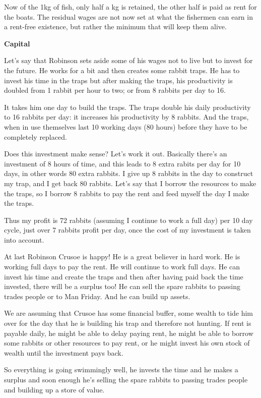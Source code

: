 \documentclass[]{tufte-handout}
\begin{document}
Now of the 1kg of fish, only half a kg is retained, the other half is
paid as rent for the boats. The residual wages are not now set at what
the fishermen can earn in a rent-free existence, but rather the minimum
that will keep them alive.

\textbf{Capital}

Let's say that Robinson sets aside some of his wages not to live but to
invest for the future. He works for a bit and then creates some rabbit
traps. He has to invest his time in the traps but after making the
traps, his productivity is doubled from 1 rabbit per hour to two; or
from 8 rabbits per day to 16.

It takes him one day to build the traps. The traps double his daily
productivity to 16 rabbits per day: it increases his productivity by 8
rabbits. And the traps, when in use themselves last 10 working days (80
hours) before they have to be completely replaced.

Does this investment make sense? Let's work it out. Basically there's an
investment of 8 hours of time, and this leads to 8 extra rabits per day
for 10 days, in other words 80 extra rabbits. I give up 8 rabbits in the
day to construct my trap, and I get back 80 rabbits. Let's say that I
borrow the resources to make the traps, so I borrow 8 rabbits to pay the
rent and feed myself the day I make the traps.

Thus my profit is 72 rabbits (assuming I continue to work a full day)
per 10 day cycle, just over 7 rabbits profit per day, once the cost of
my investment is taken into account.

At last Robinson Crusoe is happy! He is a great believer in hard work.
He is working full days to pay the rent. He will continue to work full
days. He can invest his time and create the traps and then after having
paid back the time invested, there will be a surplus too! He can sell
the spare rabbits to passing trades people or to Man Friday. And he can
build up assets.

We are assuming that Crusoe has some financial buffer, some wealth to
tide him over for the day that he is building his trap and therefore not
hunting. If rent is payable daily, he might be able to delay paying
rent, he might be able to borrow some rabbits or other resources to pay
rent, or he might invest his own stock of wealth until the investment
pays back.

So everything is going swimmingly well, he invests the time and he makes
a surplus and soon enough he's selling the spare rabbits to passing
trades people and building up a store of value.
\end{document}
